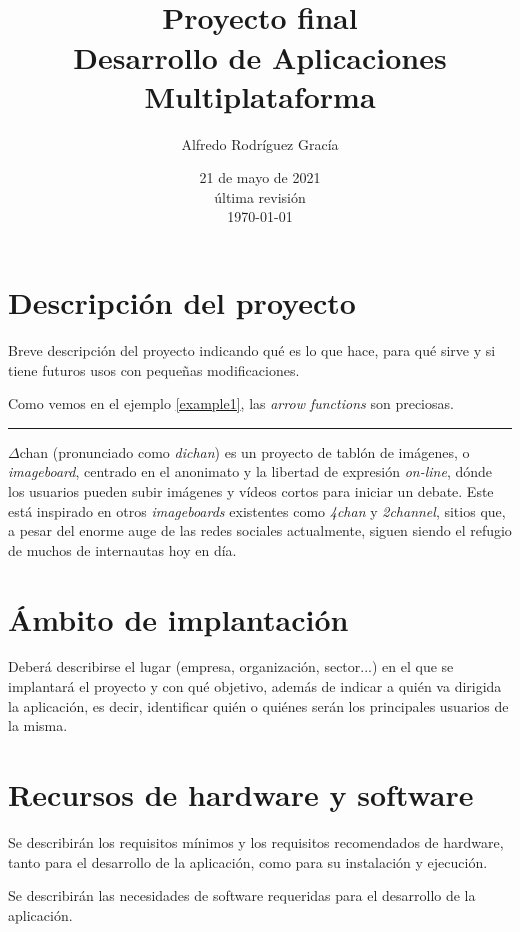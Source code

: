 \documentclass[12pt,a4paper,titlepage]{article}
\title{\Dchan\\\bigskip\normalsize{Proyecto final\\Desarrollo de Aplicaciones Multiplataforma}}
\author{Alfredo Rodríguez Gracía}
\date{21 de mayo de 2021\\\bigskip\scriptsize{última revisión\\\today}}
\newcommand\Dchan{$\Delta$chan }
\begin{document}
    \maketitle
    \tableofcontents
    \newpage

    \section{Descripción del proyecto}

    Breve descripción del proyecto indicando qué es lo que hace, para qué sirve y si tiene futuros usos con pequeñas modificaciones.

    Como vemos en el ejemplo \ref{example1}, las \emph{arrow functions} son preciosas.

    \bigskip\hrule\bigskip

    \Dchan (pronunciado como \emph{dichan}) es un proyecto de tablón de imágenes, o \emph{imageboard}\cite{wikiImageboard}, centrado en el anonimato y la libertad de expresión \emph{on-line}, dónde los usuarios pueden subir imágenes y vídeos cortos para iniciar un debate. Este está inspirado en otros \emph{imageboards} existentes como \emph{4chan} y \emph{2channel}, sitios que, a pesar del enorme auge de las redes sociales actualmente, siguen siendo el refugio de muchos de internautas hoy en día.

    \section{Ámbito de implantación}

    Deberá describirse el lugar (empresa, organización, sector...) en el que se implantará el proyecto y con qué objetivo, además de indicar a quién va dirigida la aplicación, es decir, identificar quién o quiénes serán los principales usuarios de la misma.

    \section{Recursos de hardware y software}

    Se describirán los requisitos mínimos y los requisitos recomendados de hardware, tanto para el desarrollo de la aplicación, como para su instalación y ejecución.

    Se describirán las necesidades de software requeridas para el desarrollo de la aplicación.
\end{document}
